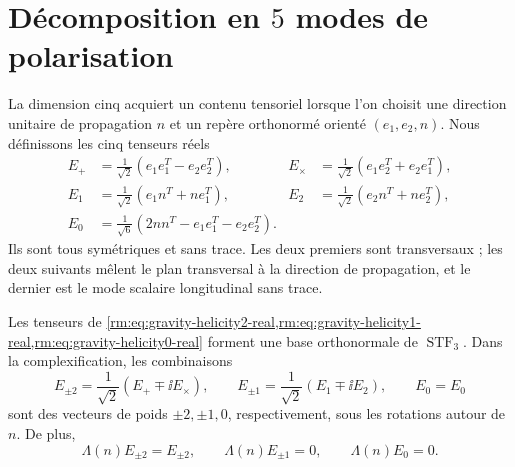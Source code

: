 \section{Décomposition en \(5\) modes de polarisation}

La dimension cinq acquiert un contenu tensoriel lorsque l’on choisit une direction
unitaire de propagation \(n\) et un repère orthonormé orienté
\((e_1,e_2,n)\). Nous définissons les cinq tenseurs réels
\begin{align}
E_{+}&=\frac1{\sqrt2}(e_1e_1^T-e_2e_2^T),
&E_{\times}&=\frac1{\sqrt2}(e_1e_2^T+e_2e_1^T),
\label{rm:eq:gravity-helicity2-real}\\
E_{1}&=\frac1{\sqrt2}(e_1n^T+ne_1^T),
&E_{2}&=\frac1{\sqrt2}(e_2n^T+ne_2^T),
\label{rm:eq:gravity-helicity1-real}\\
E_{0}&=\frac1{\sqrt6}(2nn^T-e_1e_1^T-e_2e_2^T).
\label{rm:eq:gravity-helicity0-real}
\end{align}
Ils sont tous symétriques et sans trace. Les deux premiers sont transversaux ; les
deux suivants mêlent le plan transversal à la direction de
propagation, et le dernier est le mode scalaire longitudinal sans trace.

\begin{theorem}
\label{rm:thm:gravity-five-helicities}
Les tenseurs de \cref{rm:eq:gravity-helicity2-real,rm:eq:gravity-helicity1-real,rm:eq:gravity-helicity0-real} forment une base orthonormale de \(\operatorname{STF}_3\). Dans la complexification, les combinaisons
\begin{equation}
\label{rm:eq:gravity-complex-helicities}
E_{\pm2}=\frac1{\sqrt2}(E_+\mp\ii E_\times),
\qquad
E_{\pm1}=\frac1{\sqrt2}(E_1\mp\ii E_2),
\qquad E_0=E_0
\end{equation}
sont des vecteurs de poids \(\pm2,\pm1,0\), respectivement, sous les rotations
autour de \(n\). De plus,
\begin{equation}
\label{rm:eq:gravity-tt-on-five}
\Lambda(n)E_{\pm2}=E_{\pm2},
\qquad
\Lambda(n)E_{\pm1}=0,
\qquad
\Lambda(n)E_0=0.
\end{equation}
\end{theorem}

